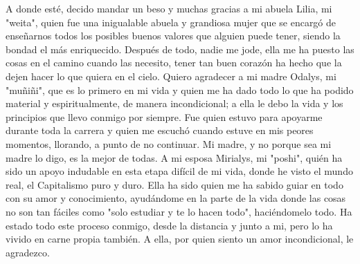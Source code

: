 \begin{acknowledgements}
    A donde esté, decido mandar un beso y muchas gracias a mi abuela Lilia, mi "weita", quien fue una inigualable abuela y grandiosa mujer
    que se encargó de enseñarnos todos los posibles buenos valores que alguien puede tener, siendo la bondad el más enriquecido.
    Después de todo, nadie me jode, ella me ha puesto las cosas en el camino cuando las necesito, tener tan buen corazón ha hecho que la dejen hacer
    lo que quiera en el cielo.
    Quiero agradecer a mi madre Odalys, mi "muñiñi", que es lo primero en mi vida y quien me ha dado todo lo que ha podido material y espiritualmente,
    de manera incondicional; a ella le debo la vida y los principios que llevo conmigo por siempre. Fue quien estuvo para apoyarme durante toda la carrera y quien
    me escuchó cuando estuve en mis peores momentos, llorando, a punto de no continuar. Mi madre, y no porque sea mi madre lo digo, es la mejor de todas.
    A mi esposa Mirialys, mi "poshi", quién ha sido un apoyo indudable en esta etapa difícil de mi vida, donde he visto el mundo real, el Capitalismo puro y duro.
    Ella ha sido quien me ha sabido guiar en todo con su amor y conocimiento, ayudándome en la parte de la vida donde las cosas no son tan fáciles como
    "solo estudiar y te lo hacen todo", haciéndomelo todo. Ha estado todo este proceso conmigo, desde la distancia y junto a mi, pero lo ha vivido en carne
    propia también. A ella, por quien siento un amor incondicional, le agradezco.
\end{acknowledgements}